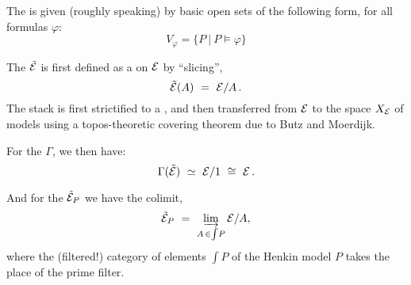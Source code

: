 \documentclass[lambek.tex]{subfiles}
\begin{document}
The  is given (roughly speaking) by basic open sets of the following form, for all formulas $\varphi$:
\[
V_\varphi = \{ P\ |\ P\models \varphi \}
\]


The  $\tilde{\mathcal{E}}$ is  first defined as a  on $\mathcal{E}$ by ``slicing'',
\[
\tilde{\mathcal{E}}(A)\ =\ \mathcal{E}/A\,.
\] 
The stack is first strictified to a , and then transferred from $\mathcal{E}$ to the space $X_{\mathcal{E}}$ of models using a topos-theoretic covering theorem due to Butz and Moerdijk.
\medskip

For the  $\Gamma$, we then have:
$$\Gamma(\tilde{\E})\ \simeq\ \E/1\ \cong\ \E\,.$$

And for the  $\tilde{\mathcal{E}}_P$ we have the colimit,
\[
\tilde{\E}_P\ =\ \varinjlim_{A\,\in\int\!{P}} \E/A, 
\]
where the (filtered!) category of elements $\int\!{P}$ of the Henkin model $P$ takes the place of the prime filter.  
\end{document}
